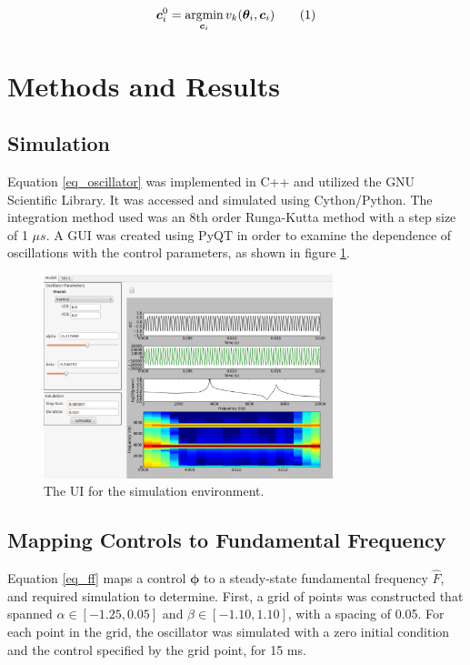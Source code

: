 \documentclass{article} %
\newcommand\numberthis{\addtocounter{equation}{1}\tag{\theequation}}
\DeclareMathOperator*{\argmin}{\arg\!\min}
\begin{document}
\begin{align*}
\bm{c}_i^0 = \argmin_{\bm{c}_i} v_k( \bm{\theta}_i, \bm{c}_i )  \numberthis \label{eq_ci}
\end{align*}


\section{Methods and Results}

\subsection{Simulation}

Equation \eqref{eq_oscillator} was implemented in C++ and utilized the GNU Scientific Library. It
was accessed and simulated using Cython/Python. The integration method used was an 8th order
Runga-Kutta method \cite{JRDormand1980} with a step size of 1 $\mu s$. A GUI was created using
PyQT in order to examine the dependence of oscillations with the control parameters, as
shown in figure \ref{fig:simulation}.

\begin{figure}[h]
\centering
\includegraphics[width=0.75\textwidth]{images/simulation.png}
\caption{The UI for the simulation environment.}
\label{fig:simulation}
\end{figure}

\subsection{Mapping Controls to Fundamental Frequency}

Equation \eqref{eq_ff} maps a control $\bm{\phi}$ to a steady-state fundamental frequency
$\hat{F}$, and required simulation to determine. First, a grid of points was constructed that spanned
$\alpha \in [-1.25, 0.05]$ and $\beta \in [-1.10, 1.10]$, with a spacing of 0.05. For each
point in the grid, the oscillator was simulated with a zero initial condition and the control
specified by the grid point, for 15 ms.
\end{document}
